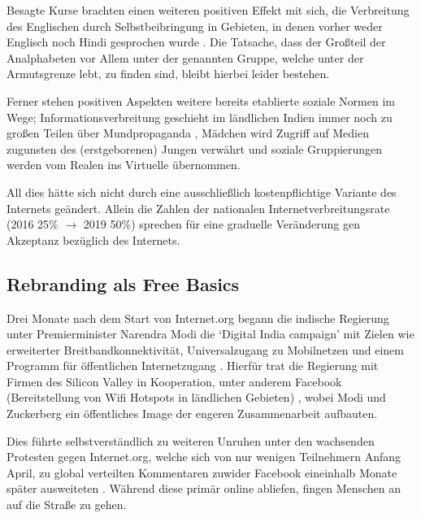 \documentclass{article}
\begin{document}
Besagte Kurse brachten einen weiteren positiven Effekt mit sich, die Verbreitung des Englischen durch Selbstbeibringung in Gebieten, in denen vorher weder Englisch noch Hindi gesprochen wurde \parencite{empowermentThroughFacebook}. Die Tatsache, dass der Großteil der Analphabeten vor Allem unter der genannten Gruppe, welche unter der Armutsgrenze lebt, zu finden sind, bleibt hierbei leider bestehen.

\medskip

Ferner stehen positiven Aspekten weitere bereits etablierte soziale Normen im Wege; Informationsverbreitung geschieht im ländlichen Indien immer noch zu großen Teilen über Mundpropaganda \parencite[259]{everydayLife}, Mädchen wird Zugriff auf Medien zugunsten des (erstgeborenen) Jungen verwährt \parencite{empowermentThroughFacebook} und soziale Gruppierungen werden vom Realen ins Virtuelle übernommen.

\medskip

All dies hätte sich nicht durch eine ausschließlich kostenpflichtige Variante des Internets geändert.
Allein die Zahlen der nationalen Internetverbreitungsrate (2016 25\% $\to$ 2019 50\%) sprechen für eine graduelle Veränderung gen Akzeptanz bezüglich des Internets.

\subsection{Rebranding als Free Basics}

Drei Monate nach dem Start von Internet.org begann die indische Regierung unter Premierminister Narendra Modi die `Digital India campaign' mit Zielen wie erweiterter Breitbandkonnektivität, Universalzugang zu Mobilnetzen und einem Programm für öffentlichen Internetzugang \parencite{digitalPillars}.
Hierfür trat die Regierung mit Firmen des Silicon Valley in Kooperation, unter anderem Facebook (Bereitstellung von Wifi Hotspots in ländlichen Gebieten) \parencite[254]{everydayLife},
wobei Modi und Zuckerberg ein öffentliches Image der engeren Zusammenarbeit aufbauten.
\medskip

Dies führte selbstverständlich zu weiteren Unruhen unter den wachsenden Protesten gegen Internet.org, welche sich von nur wenigen Teilnehmern Anfang April, zu global verteilten Kommentaren zuwider Facebook eineinhalb Monate später ausweiteten \autocite{BBC3}.
Während diese primär online abliefen, fingen Menschen an auf die Straße zu gehen.
\medskip
\end{document}
